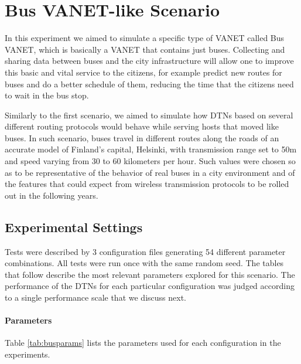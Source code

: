 \section{Bus VANET-like Scenario}

In this experiment we aimed to simulate a specific type of VANET called Bus
VANET, which is basically a VANET that contains just buses. Collecting and
sharing data between buses and the city infrastructure will allow one to
improve this basic and vital service to the citizens, for example predict new
routes for buses and do a better schedule of them, reducing the time that the
citizens need to wait in the bus stop.

Similarly to the first scenario, we aimed to simulate how DTNs based on several
different routing protocols would behave while serving hosts that moved like
buses. In such scenario, buses travel in different routes along the roads of an
accurate model of Finland's capital, Helsinki, with transmission range set to
50m and speed varying from 30 to 60 kilometers per hour. Such values were
chosen so as to be representative of the behavior of real buses in a city
environment and of the features that could expect from wireless transmission
protocols to be rolled out in the following years.

\subsection{Experimental Settings}

Tests were described by 3 configuration files generating 54 different parameter
combinations.  All tests were run once with the same random seed.  The tables
that follow describe the most relevant parameters explored for this scenario.
The performance of the DTNs for each particular configuration was judged
according to a single performance scale that we discuss next.

\paragraph{Parameters}

Table \ref{tab:busparams} lists the parameters used for each configuration
in the experiments.

